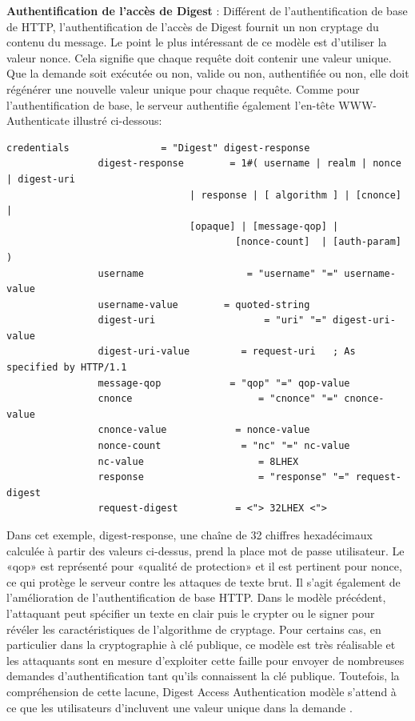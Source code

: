 \textbf{Authentification de l'accès de Digest} : Différent de l'authentification de base de HTTP, l'authentification de l'accès de Digest fournit un non cryptage du contenu du message. Le point le plus intéressant de ce modèle est d'utiliser la valeur nonce. Cela signifie que chaque requête doit contenir une valeur unique. Que la demande soit exécutée ou non, valide ou non, authentifiée ou non, elle doit régénérer une nouvelle valeur unique pour chaque requête. Comme pour l'authentification de base, le serveur authentifie également l'en-tête WWW-Authenticate illustré ci-dessous:
\begin{verbatim}
credentials                = "Digest" digest-response
                digest-response        = 1#( username | realm | nonce | digest-uri
                       			| response | [ algorithm ] | [cnonce] |
                       			[opaque] | [message-qop] |
                           				[nonce-count]  | [auth-param] )
                username                  = "username" "=" username-value
                username-value        = quoted-string
                digest-uri                   = "uri" "=" digest-uri-value
                digest-uri-value         = request-uri   ; As specified by HTTP/1.1
                message-qop            = "qop" "=" qop-value
                cnonce                      = "cnonce" "=" cnonce-value
                cnonce-value            = nonce-value
                nonce-count              = "nc" "=" nc-value
                nc-value                    = 8LHEX
                response 	                = "response" "=" request-digest
                request-digest          = <"> 32LHEX <">
\end{verbatim}
Dans cet exemple, digest-response, une chaîne de 32 chiffres hexadécimaux calculée à partir des valeurs ci-dessus, prend la place mot de passe utilisateur. Le «qop» est représenté pour «qualité de protection» et il est pertinent pour nonce, ce qui protège le serveur contre les attaques de texte brut. Il s'agit également de l'amélioration de l'authentification de base HTTP. Dans le modèle précédent, l'attaquant peut spécifier un texte en clair puis le crypter ou le signer pour révéler les caractéristiques de l'algorithme de cryptage. Pour certains cas, en particulier dans la cryptographie à clé publique, ce modèle est très réalisable et les attaquants sont en mesure d'exploiter cette faille pour envoyer de nombreuses demandes d'authentification tant qu'ils connaissent la clé publique. Toutefois, la compréhension de cette lacune, Digest Access Authentication modèle s'attend à ce que les utilisateurs d'incluvent une valeur unique dans la demande \cite{16}.

